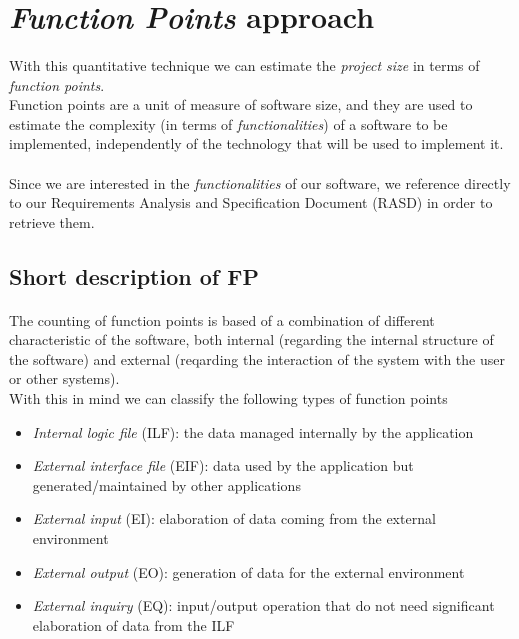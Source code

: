 \section{\textit{Function Points} approach}
\paragraph{}With this quantitative technique we can estimate the \textit{project size} in terms of \textit{function points}.\\
Function points are a unit of measure of software size, and they are used to estimate the complexity (in terms of \textit{functionalities}) of a software to be implemented, independently of the technology that will be used to implement it.

\paragraph{}Since we are interested in the \textit{functionalities} of our software, we reference directly to our Requirements Analysis and Specification Document (RASD) in order to retrieve them.

\subsection{Short description of FP}
\paragraph{}The counting of function points is based of a combination of different characteristic of the software, both internal (regarding the internal structure of the software) and external (reqarding the interaction of the system with the user or other systems).\\
With this in mind we can classify the following types of function points
\begin{itemize}
	\item \textit{Internal logic file} (ILF): the data managed internally by the application
	\item \textit{External interface file} (EIF): data used by the application but generated/maintained by other applications
	\item \textit{External input} (EI): elaboration of data coming from the external environment
	\item \textit{External output} (EO): generation of data for the external environment
	\item \textit{External inquiry} (EQ): input/output operation that do not need significant elaboration of data from the ILF
\end{itemize}

